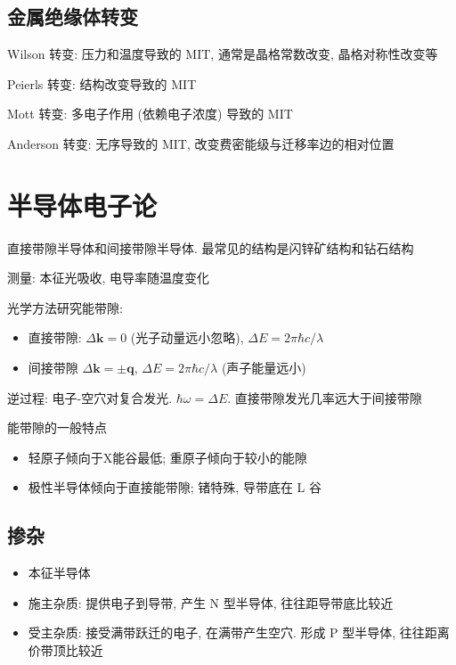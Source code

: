 \documentclass[11pt,a4paper]{article}%
\numberwithin{equation}{section}%
\renewcommand*{\vec}[1]{\bm{#1}}%
\begin{document}
\subsection{金属绝缘体转变} %
\label{sub:mit}
Wilson 转变: 压力和温度导致的 MIT, 通常是晶格常数改变, 晶格对称性改变等

Peierls 转变: 结构改变导致的 MIT

Mott 转变: 多电子作用 (依赖电子浓度) 导致的 MIT

Anderson 转变: 无序导致的 MIT, 改变费密能级与迁移率边的相对位置
\section{半导体电子论} %
\label{sec:semi_conduct_e}
直接带隙半导体和间接带隙半导体. 最常见的结构是闪锌矿结构和钻石结构

测量: 本征光吸收, 电导率随温度变化

光学方法研究能带隙: 
\begin{itemize}
	\item 直接带隙: $\Delta \vec k = 0$ (光子动量远小忽略), $\Delta E = 2\pi\hbar c/\lambda$
	\item 间接带隙 $\Delta \vec k = \pm\vec q$, $\Delta E = 2\pi\hbar c/\lambda$ (声子能量远小)
\end{itemize}
逆过程: 电子-空穴对复合发光. $\hbar\omega = \Delta E$. 直接带隙发光几率远大于间接带隙

能带隙的一般特点
\begin{itemize}
	\item 轻原子倾向于X能谷最低; 重原子倾向于较小的能隙
	\item 极性半导体倾向于直接能带隙; 锗特殊, 导带底在 L 谷
\end{itemize}
\subsection{掺杂} %
\label{sub:dopant}
\begin{itemize}
	\item 本征半导体
	\item 施主杂质: 提供电子到导带, 产生 N 型半导体, 往往距导带底比较近
	\item 受主杂质: 接受满带跃迁的电子, 在满带产生空穴. 形成 P 型半导体, 往往距离价带顶比较近
\end{itemize}
\end{document}

